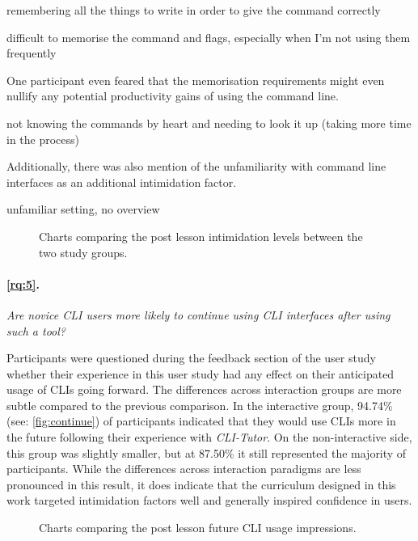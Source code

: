 \begin{quotes}
	remembering all the things to write in order to give the command correctly
\end{quotes}

\begin{quotes}
	difficult to memorise the command and flags, especially when I'm not using them frequently
\end{quotes}

One participant even feared that the memorisation requirements might even
nullify any potential productivity gains of using the command line.

\begin{quotes}
	not knowing the commands by heart and needing to look it up (taking more time in the
	process)
\end{quotes}

Additionally, there was also mention of the unfamiliarity with command line
interfaces as an additional intimidation factor.

\begin{quotes}
	unfamiliar setting, no overview
\end{quotes}


\begin{figure}[htbp]
	\centering
	\scalebox{0.67}{}
	\caption{Charts comparing the post lesson intimidation levels between the two study groups.}
	\label{fig:confidence}
\end{figure}
\clearpage

\paragraph{\ref{rq:5}.} \textit{Are novice CLI users more likely to continue using CLI interfaces
	after using such a tool?}

Participants were questioned during the feedback section of the user study
whether their experience in this user study had any effect on their anticipated
usage of CLIs going forward. The differences across interaction groups are more
subtle compared to the previous comparison. In the interactive group, 94.74\%
(see: \autoref{fig:continue}) of participants indicated that they would use
CLIs more in the future following their experience with \textit{CLI-Tutor}. On
the non-interactive side, this group was slightly smaller, but at 87.50\% it
still represented the majority of participants. While the differences across
interaction paradigms are less pronounced in this result, it does indicate that
the curriculum designed in this work targeted intimidation factors well and
generally inspired confidence in users.

\begin{figure}[htbp]
	\centering
	\scalebox{0.67}{}
	\caption{Charts comparing the post lesson future CLI usage impressions.}
	\label{fig:continue}
\end{figure}
